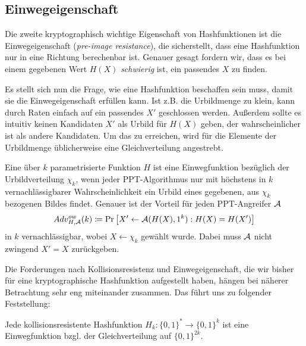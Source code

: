 \subsection{Einwegeigenschaft}
Die zweite kryptographisch wichtige Eigenschaft von Hashfunktionen ist
die Einwegeigenschaft (\emph{pre-image
resistance})\indexPreImageResistance, die sicherstellt, dass eine
Hashfunktion nur in eine Richtung berechenbar ist. Genauer gesagt
fordern wir, dass es bei einem gegebenen Wert $H(X)$ \emph{schwierig}
ist, ein passendes $X$ zu finden.

Es stellt sich nun die Frage, wie eine Hashfunktion beschaffen sein
muss, damit sie die Einwegeigenschaft erfüllen kann. Ist z.B. die
Urbildmenge zu klein, kann durch Raten einfach auf ein passendes $X'$
geschlossen werden. Außerdem sollte es intuitiv keinen Kandidaten $X'$
als Urbild für $H(X)$ geben, der wahrscheinlicher ist als andere
Kandidaten. Um das zu erreichen, wird für die Elemente der Urbildmenge
üblicherweise eine Gleichverteilung angestrebt.

\begin{definition}[Einwegfunktion]
Eine über $k$ parametrisierte Funktion $H$ ist eine Einwegfunktion
\indexPreImageResistance bezüglich der Urbildverteilung $\chi_k$, wenn
jeder PPT-Algorithmus nur mit höchstens in $k$ vernachlässigbarer
Wahrscheinlichkeit ein Urbild eines gegebenen, aus $\chi_k$ bezogenen
Bildes findet. Genauer ist der Vorteil für jeden PPT-Angreifer $\mathcal{A}$
\begin{equation*}
Adv^{ow}_{H,\mathcal{A}}(k)\coloneqq \Pr \left[ X' \leftarrow \mathcal{A}(H(X), 1^k) : H(X) = H(X')\right]
\end{equation*} 
in $k$ vernachlässigbar, wobei $X \leftarrow \chi_k$ gewählt
wurde. Dabei muss $\mathcal{A}$ nicht zwingend $X' = X$ zurückgeben.
\end{definition}

Die Forderungen nach Kollisionsresistenz und Einwegeigenschaft, die wir
bisher für eine kryptographische Hashfunktion aufgestellt haben, hängen
bei näherer Betrachtung sehr eng miteinander
zusammen\indexCollisionResistance\indexPreImageResistance. Das führt uns
zu folgender Feststellung:

\begin{theorem}
Jede kollisionsresistente Hashfunktion $H_k \colon \{0,1\}^* \rightarrow
\{0,1\}^k$ ist eine Einwegfunktion bzgl. der Gleichverteilung auf
$\{0,1\}^{2k}$. 
\end{theorem}

